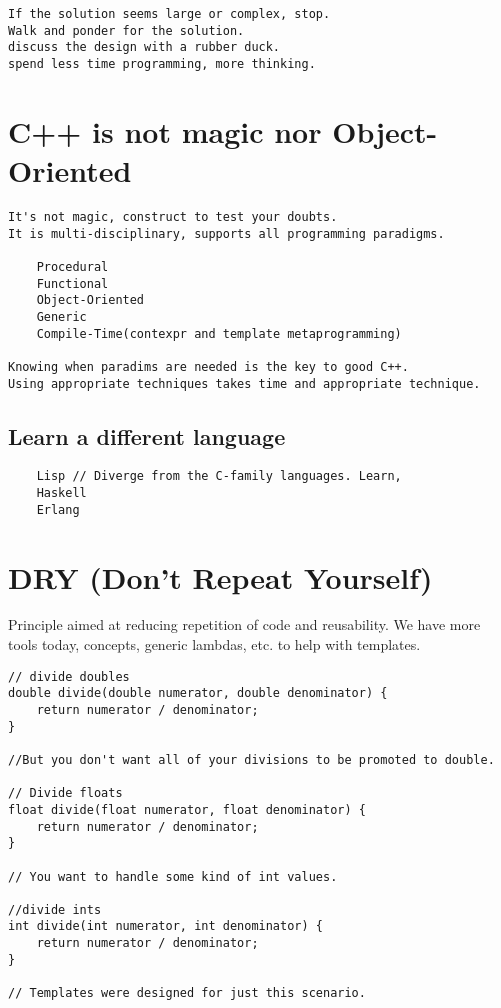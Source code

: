 \begin{verbatim}
If the solution seems large or complex, stop. 
Walk and ponder for the solution. 
discuss the design with a rubber duck. 
spend less time programming, more thinking.
\end{verbatim}

\section{C++ is not magic nor Object-Oriented}

\begin{verbatim}
It's not magic, construct to test your doubts.
It is multi-disciplinary, supports all programming paradigms.

    Procedural
    Functional
    Object-Oriented
    Generic
    Compile-Time(contexpr and template metaprogramming)

Knowing when paradims are needed is the key to good C++.
Using appropriate techniques takes time and appropriate technique. 
\end{verbatim}

\subsection{Learn a different language}

\begin{verbatim}
    Lisp // Diverge from the C-family languages. Learn,
    Haskell
    Erlang
\end{verbatim}

\section{DRY (Don't Repeat Yourself)}

Principle aimed at reducing repetition of code and reusability. 
We have more tools today, concepts, generic lambdas, etc. to help with templates.

\begin{verbatim}
// divide doubles
double divide(double numerator, double denominator) {
    return numerator / denominator;
}

//But you don't want all of your divisions to be promoted to double. 

// Divide floats
float divide(float numerator, float denominator) {
    return numerator / denominator;
}

// You want to handle some kind of int values. 

//divide ints
int divide(int numerator, int denominator) {
    return numerator / denominator;
}

// Templates were designed for just this scenario. 
\end{verbatim}

